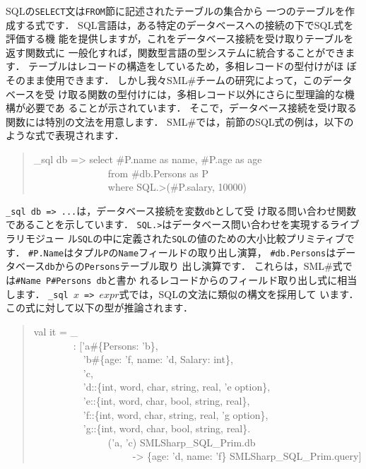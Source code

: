 \documentclass{jbook}
\newcommand{\smlsharp}{SML\#}
\newenvironment{program}{\begin{tt}\begin{quote}}{\end{quote}\end{tt}}
\newcommand{\myem}{\ \ \ \ \  }
\begin{document}
\ifx\jp%
	SQLの{\tt SELECT}文は{\tt FROM}節に記述されたテーブルの集合から
一つのテーブルを作成する式です．
	SQL言語は，ある特定のデータベースへの接続の下でSQL式を評価する機
能を提供しますが，これをデータベース接続を受け取りテーブルを返す関数式に
一般化すれば，関数型言語の型システムに統合することができます．
	テーブルはレコードの構造をしているため，多相レコードの型付けがほ
ぼそのまま使用できます．
	しかし我々\smlsharp{}チームの研究によって，このデータベースを受
け取る関数の型付けには，多相レコード以外にさらに型理論的な機構が必要であ
ることが示されています\cite{ohori11}．
	そこで，データベース接続を受け取る関数には特別の文法を用意します．
	\smlsharp{}では，前節のSQL式の例は，以下のような式で表現されます．
\begin{program}
\_sql db => select \#P.name as name, \#P.age as age\\
\myem\myem\myem from \#db.Persons as P\\
\myem\myem\myem where SQL.>(\#P.salary, 10000)
\end{program}
	{\tt \_sql db => ...}は，データベース接続を変数{\tt db}として受
け取る問い合わせ関数であることを示しています．
	{\tt SQL.>}はデータベース問い合わせを実現するライブラリモジュー
ル{\tt SQL}の中に定義された{\tt SQL}の値のための大小比較プリミティブです．
	{\tt \#P.Name}はタプル{\tt P}の{\tt Name}フィールドの取り出し演算，
{\tt \#db.Persons}はデータベース{\tt db}からの{\tt Persons}テーブル取り
出し演算です．
	これらは，\smlsharp{}式では{\tt \#Name P}{\tt \#Persons db}と書か
れるレコードからのフィールド取り出し式に相当します．
	{\tt \_sql $x$ => $expr$}式では，SQLの文法に類似の構文を採用して
います．
	この式に対して以下の型が推論されます．
\begin{program}
val it = \_
\\\myem\ \ \   : ['a\#\{Persons: 'b\},
\\\myem\myem     'b\#\{age: 'f, name: 'd, Salary: int\},
\\\myem\myem     'c,
\\\myem\myem     'd::\{int, word, char, string, real, 'e option\},
\\\myem\myem     'e::\{int, word, char, bool, string, real\},
\\\myem\myem     'f::\{int, word, char, string, real, 'g option\},
\\\myem\myem     'g::\{int, word, char, bool, string, real\}.
\\\myem\myem\myem       ('a, 'c) SMLSharp\_SQL\_Prim.db
\\\myem\myem\myem\myem  -> \{age: 'd, name: 'f\} SMLSharp\_SQL\_Prim.query]
\end{program}
\end{document}
